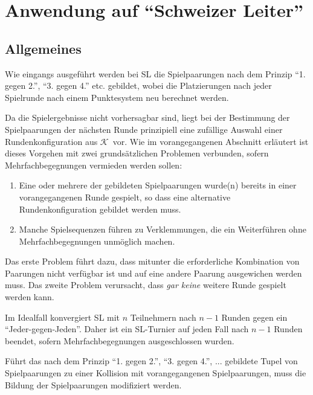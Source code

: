 \documentclass[DIV=15, 10pt]{scrartcl}
\newcommand{\KSet}{$\mathcal{K}$}
\begin{document}
\section{Anwendung auf "`Schweizer Leiter"'}

\subsection{Allgemeines}

Wie eingangs ausgeführt werden bei SL die Spielpaarungen nach dem Prinzip "`1. gegen 2."', "`3. gegen 4."' etc. gebildet, wobei die Platzierungen nach jeder Spielrunde nach einem Punktesystem neu berechnet werden.

Da die Spielergebnisse nicht vorhersagbar sind, liegt bei der Bestimmung der Spielpaarungen der nächsten Runde prinzipiell eine zufällige Auswahl einer Rundenkonfiguration aus \KSet\ vor. Wie im vorangegangenen Abschnitt erläutert ist dieses Vorgehen mit zwei grundsätzlichen Problemen verbunden, sofern Mehrfachbegegnungen vermieden werden sollen:

\begin{enumerate}

\item Eine oder mehrere der gebildeten Spielpaarungen wurde(n) bereits in einer vorangegangenen Runde gespielt, so dass eine alternative Rundenkonfiguration gebildet werden muss.

\item Manche Spielsequenzen führen zu Verklemmungen, die ein Weiterführen ohne Mehrfachbegegnungen unmöglich machen.

\end{enumerate}

Das erste Problem führt dazu, dass mitunter die erforderliche Kombination von Paarungen nicht verfügbar ist und auf eine andere Paarung ausgewichen werden muss. Das zweite Problem verursacht, dass \emph{gar keine} weitere Runde gespielt werden kann.

Im Idealfall konvergiert SL mit $n$ Teilnehmern nach $n-1$ Runden gegen ein "`Jeder-gegen-Jeden"'. Daher ist ein SL-Turnier auf jeden Fall nach $n-1$ Runden beendet, sofern Mehrfachbegegnungen ausgeschlossen wurden.


Führt das nach dem Prinzip "`1. gegen 2."', "`3. gegen 4."', ... gebildete Tupel von Spielpaarungen zu einer Kollision mit vorangegangenen Spielpaarungen, muss die Bildung der Spielpaarungen modifiziert werden.
\end{document}

